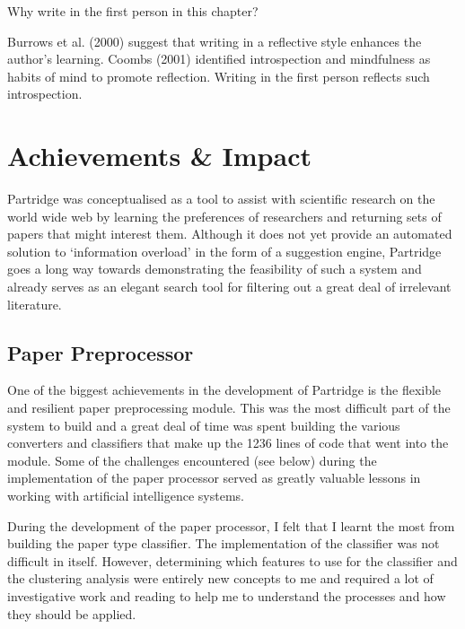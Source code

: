 %  
%

Why write in the first person in this chapter?

Burrows et al. (2000) suggest that writing in a reflective style enhances the
author's learning\cite{JEE:JEE657}. Coombs (2001) identified introspection and
mindfulness as habits of mind to promote reflection. Writing in the first
person reflects such introspection\cite{coombs2001reflective}.

\section{ Achievements \& Impact}

Partridge was conceptualised as a tool to assist with scientific research on
the world wide web by learning the preferences of researchers and returning
sets of papers that might interest them. Although it does not yet provide an
automated solution to `information overload' in the form of a suggestion
engine, Partridge goes a long way towards demonstrating the feasibility of such
a system and already serves as an elegant search tool for filtering out a great
deal of irrelevant literature.

\subsection{ Paper Preprocessor}

One of the biggest achievements in the development of Partridge is the flexible
and resilient paper preprocessing module. This was the most difficult part of
the system to build and a great deal of time was spent building the various
converters and classifiers that make up the 1236 lines of code that went into
the module. Some of the challenges encountered (see below) during the
implementation of the paper processor served as greatly valuable lessons in
working with artificial intelligence systems. 

During the development of the paper processor, I felt that I learnt the most
from building the paper type classifier. The implementation of the classifier
was not difficult in itself. However, determining which features to use for the
classifier and the clustering analysis were entirely new concepts to me and
required a lot of investigative work and reading to help me to understand the
processes and how they should be applied.

